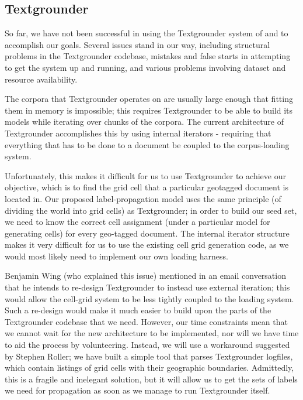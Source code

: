 \subsection{Textgrounder}
So far, we have not been successful in using the Textgrounder system of 
\cite{wing-baldridge:11} and \cite{rolleretal:12} to accomplish our goals. 
Several issues stand in our way, including structural problems in the
Textgrounder codebase, mistakes and false starts in attempting to get
the system up and running, and various problems involving dataset and resource
availability.
\par
The corpora that Textgrounder operates on are usually large enough that fitting them
in memory is impossible; this requires Textgrounder to be able to
build its models while iterating over chunks of the corpora.
The current architecture of Textgrounder accomplishes this by using internal
iterators - requiring that everything that has to be done to a document be
coupled to the corpus-loading system.
\par
Unfortunately, this makes it difficult for us to use Textgrounder to achieve
our objective, which is to find the grid cell that a particular geotagged document is located in.
Our proposed label-propagation model uses the same principle (of dividing the
world into grid cells) as Textgrounder; in order to build our seed set, we need to
know the correct cell assignment (under a particular model for generating
cells) for every geo-tagged document.
The internal iterator structure makes it very difficult for us to use the
existing cell grid generation code, as we would most likely need to implement our own
loading harness.
\par
Benjamin Wing (who explained this issue) mentioned in an email conversation that he intends to re-design
Textgrounder to instead use external iteration; this would allow the cell-grid
system to be less tightly coupled to the loading system.
Such a re-design would make it much easier to build upon the parts of the
Textgrounder codebase that we need. However, our time constraints mean that we cannot 
wait for the new architecture to be implemented, nor will we have
time to aid the process by volunteering.
Instead, we will use a workaround suggested by Stephen Roller; we have built a
simple tool that parses Textgrounder logfiles, which contain listings of grid
cells with their geographic boundaries.
Admittedly, this is a fragile and inelegant solution, but it will allow us to
get the sets of labels we need for propagation as soon as we manage to run
Textgrounder itself.
